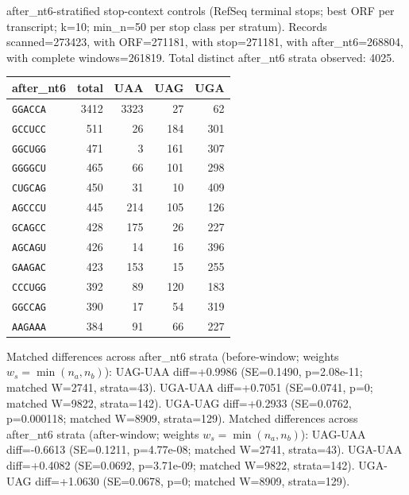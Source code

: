 after\_nt6-stratified stop-context controls (RefSeq terminal stops; best ORF per transcript; k=10; min\_n=50 per stop class per stratum). Records scanned=273423, with ORF=271181, with stop=271181, with after\_nt6=268804, with complete windows=261819. Total distinct after\_nt6 strata observed: 4025.
\begin{center}
\small
\setlength{\tabcolsep}{6pt}
\renewcommand{\arraystretch}{1.15}
\begin{tabular}{lrrrr}
\toprule
after\_nt6 & total & UAA & UAG & UGA \\
\midrule
\texttt{GGACCA} & 3412 & 3323 & 27 & 62 \\
\texttt{GCCUCC} & 511 & 26 & 184 & 301 \\
\texttt{GGCUGG} & 471 & 3 & 161 & 307 \\
\texttt{GGGGCU} & 465 & 66 & 101 & 298 \\
\texttt{CUGCAG} & 450 & 31 & 10 & 409 \\
\texttt{AGCCCU} & 445 & 214 & 105 & 126 \\
\texttt{GCAGCC} & 428 & 175 & 26 & 227 \\
\texttt{AGCAGU} & 426 & 14 & 16 & 396 \\
\texttt{GAAGAC} & 423 & 153 & 15 & 255 \\
\texttt{CCCUGG} & 392 & 89 & 120 & 183 \\
\texttt{GGCCAG} & 390 & 17 & 54 & 319 \\
\texttt{AAGAAA} & 384 & 91 & 66 & 227 \\
\bottomrule
\end{tabular}
\end{center}
\noindent Matched differences across after\_nt6 strata (before-window; weights $w_s=\min(n_a,n_b)$):
 UAG-UAA diff=+0.9986 (SE=0.1490, p=2.08e-11; matched W=2741, strata=43).
 UGA-UAA diff=+0.7051 (SE=0.0741, p=0; matched W=9822, strata=142).
 UGA-UAG diff=+0.2933 (SE=0.0762, p=0.000118; matched W=8909, strata=129).
\noindent Matched differences across after\_nt6 strata (after-window; weights $w_s=\min(n_a,n_b)$):
 UAG-UAA diff=-0.6613 (SE=0.1211, p=4.77e-08; matched W=2741, strata=43).
 UGA-UAA diff=+0.4082 (SE=0.0692, p=3.71e-09; matched W=9822, strata=142).
 UGA-UAG diff=+1.0630 (SE=0.0678, p=0; matched W=8909, strata=129).
